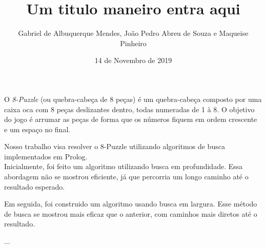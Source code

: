 \documentclass[12pt,a4paper]{article}
\author{Gabriel de Albuquerque Mendes, João Pedro Abreu de Souza e Maqueise Pinheiro}
\title{Um titulo maneiro entra aqui}
\date{14 de Novembro de 2019}
\begin{document}
\maketitle
O \textit{8-Puzzle} (ou quebra-cabeça de 8 peças) é um quebra-cabeça composto por uma caixa oca com 8 peças deslizantes dentro, todas numeradas de 1 à 8. O objetivo do jogo é arrumar as peças de forma que os números fiquem em ordem crescente e um espaço no final.

Nosso trabalho visa resolver o 8-Puzzle utilizando algoritmos de busca implementados em Prolog.
\\

Inicialmente, foi feito um algoritmo utilizando busca em profundidade. Essa abordagem não se mostrou eficiente, já que percorria um longo caminho até o resultado esperado.

Em seguida, foi construido um algoritmo usando busca em largura. Esse método de busca se mostrou mais eficaz que o anterior, com caminhos mais diretos até o resultado.

...
\end{document}
